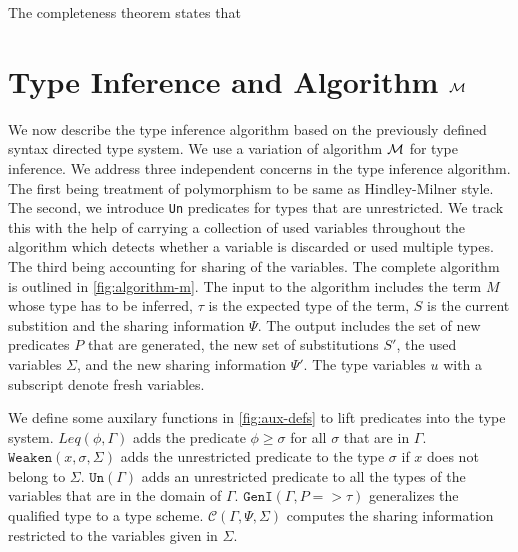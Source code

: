 The completeness theorem states that 

\section{Type Inference and Algorithm $\mathcal{M}$}\label{sec:algorithm-m}
We now describe the type inference algorithm based on the previously defined syntax directed
type system. We use a variation of algorithm $\mathcal{M}$ \citep{lee_proofs_1998} for type inference.
We address three independent concerns in the type inference algorithm.
The first being treatment of polymorphism to be same as Hindley-Milner style. The second, we introduce
\texttt{Un} predicates for types that are unrestricted. We track this with the help of carrying a
collection of used variables throughout the algorithm which detects whether a variable is discarded
or used multiple types. The third being accounting for sharing of the variables.
The complete algorithm is outlined in \cref{fig:algorithm-m}. The input to the algorithm includes the term $M$ whose
type has to be inferred, $\tau$ is the expected type of the term, $S$ is the current substition and the
sharing information $\Psi$. The output includes the set of new predicates $P$ that are generated,
the new set of substitutions $S'$, the used variables $\Sigma$, and the new sharing information $\Psi'$.
The type variables $u$ with a subscript denote fresh variables.

We define some auxilary functions in \cref{fig:aux-defs} to lift predicates into the type system.
$Leq(\phi, \Gamma)$ adds the predicate $\phi \geq \sigma$ for all $\sigma$ that are in $\Gamma$.
$\texttt{Weaken}(x, \sigma, \Sigma)$ adds the unrestricted predicate to the type $\sigma$
if $x$ does not belong to $\Sigma$. $\texttt{Un}(\Gamma)$ adds an unrestricted
predicate to all the types of the variables that are in the domain of $\Gamma$.
$\texttt{GenI}(\Gamma, P => \tau)$ generalizes the qualified type to a type scheme.
$\mathcal{C}(\Gamma, \Psi, \Sigma)$ computes the sharing information
restricted to the variables given in $\Sigma$.

